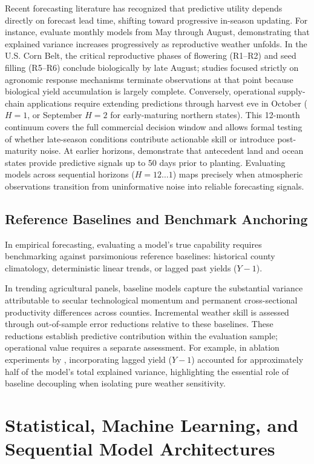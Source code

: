 Recent forecasting literature has recognized that predictive utility depends directly on forecast lead time, shifting toward progressive in-season updating. For instance, \citet{ChenZhang2026} evaluate monthly models from May through August, demonstrating that explained variance increases progressively as reproductive weather unfolds. In the U.S. Corn Belt, the critical reproductive phases of flowering (R1--R2) and seed filling (R5--R6) conclude biologically by late August; studies focused strictly on agronomic response mechanisms terminate observations at that point because biological yield accumulation is largely complete. Conversely, operational supply-chain applications require extending predictions through harvest eve in October ($H=1$, or September $H=2$ for early-maturing northern states). This 12-month continuum covers the full commercial decision window and allows formal testing of whether late-season conditions contribute actionable skill or introduce post-maturity noise. At earlier horizons, \citet{Vijverberg2023} demonstrate that antecedent land and ocean states provide predictive signals up to 50 days prior to planting. Evaluating models across sequential horizons ($H=12 \dots 1$) maps precisely when atmospheric observations transition from uninformative noise into reliable forecasting signals.

\subsection{Reference Baselines and Benchmark Anchoring}
In empirical forecasting, evaluating a model's true capability requires benchmarking against parsimonious reference baselines: historical county climatology, deterministic linear trends, or lagged past yields ($Y-1$). 

In trending agricultural panels, baseline models capture the substantial variance attributable to secular technological momentum and permanent cross-sectional productivity differences across counties. Incremental weather skill is assessed through out-of-sample error reductions relative to these baselines. These reductions establish predictive contribution within the evaluation sample; operational value requires a separate assessment. For example, in ablation experiments by \citet{ChenZhang2026}, incorporating lagged yield ($Y-1$) accounted for approximately half of the model's total explained variance, highlighting the essential role of baseline decoupling when isolating pure weather sensitivity.

\section{Statistical, Machine Learning, and Sequential Model Architectures}
\label{sec:lit_model_families}

